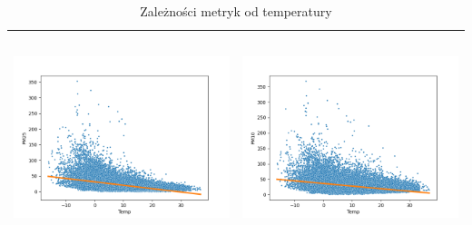\documentclass[18pt, letterpaper]{article}
\begin{document}
\begin{table}[H]
\begin{tabular}{|c|c|}
\includegraphics[width=80mm,height=60mm]{visualisations/corr_plots/TempxPM25_scatter.png}  & \includegraphics[width=80mm,height=60mm]{visualisations/corr_plots/TempxPM10_scatter.png} \\ \hline
\end{tabular}
\caption{Zależności metryk od temperatury}
\label{table:temperature}
\end{table}
\end{document}

